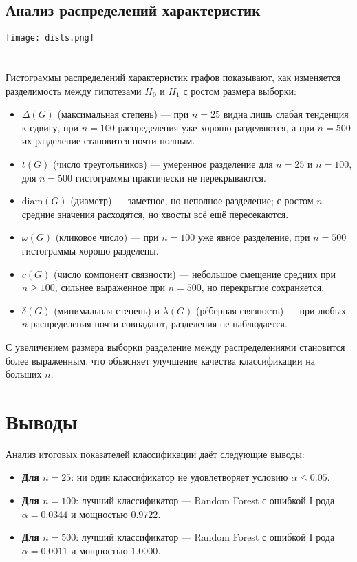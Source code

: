 \documentclass[12pt,a4paper]{article}
\begin{document}
\subsection{Анализ распределений характеристик}
\texttt{[image: dists.png]}\\\\\\
Гистограммы распределений характеристик графов показывают, как изменяется разделимость между гипотезами $H_0$ и $H_1$ с ростом размера выборки:
\begin{itemize}
    \item $\Delta(G)$ (максимальная степень) — при $n=25$ видна лишь слабая тенденция к сдвигу, при $n=100$ распределения уже хорошо разделяются, а при $n=500$ их разделение становится почти полным.
    \item $t(G)$ (число треугольников) — умеренное разделение для $n=25$ и $n=100$, для $n=500$ гистограммы практически не перекрываются.
    \item $\mathrm{diam}(G)$ (диаметр) — заметное, но неполное разделение; с ростом $n$ средние значения расходятся, но хвосты всё ещё пересекаются.
    \item $\omega(G)$ (кликовое число) — при $n=100$ уже явное разделение, при $n=500$ гистограммы хорошо разделены.
    \item $c(G)$ (число компонент связности) — небольшое смещение средних при $n\ge100$, сильнее выраженное при $n=500$, но перекрытие сохраняется.
    \item $\delta(G)$ (минимальная степень) и $\lambda(G)$ (рёберная связность) — при любых $n$ распределения почти совпадают, разделения не наблюдается.
\end{itemize}
С увеличением размера выборки разделение между распределениями становится более выраженным, что объясняет улучшение качества классификации на больших $n$.

\section{Выводы}

Анализ итоговых показателей классификации даёт следующие выводы:

\begin{itemize}
    \item \textbf{Для $n=25$}: ни один классификатор не удовлетворяет условию $\alpha \leq 0.05$.
    \item \textbf{Для $n=100$}: лучший классификатор — Random Forest с ошибкой I рода $\alpha = 0.0344$ и мощностью $0.9722$.
    \item \textbf{Для $n=500$}: лучший классификатор — Random Forest с ошибкой I рода $\alpha = 0.0011$ и мощностью $1.0000$.
\end{itemize}
\end{document}
